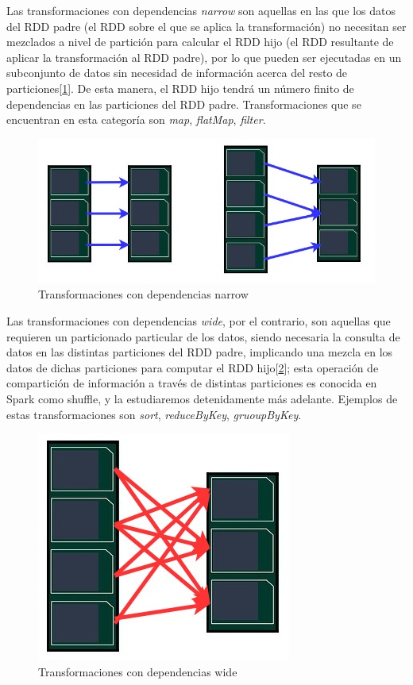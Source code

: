 Las transformaciones con dependencias \textit{narrow} son aquellas en las que los datos del RDD padre (el RDD sobre el que se aplica la transformación) no necesitan ser mezclados a nivel de partición para calcular el RDD hijo (el RDD resultante de aplicar la transformación al RDD padre), por lo que pueden ser ejecutadas en un subconjunto de datos sin necesidad de información acerca del resto de particiones[\ref{narrow}]. De esta manera, el RDD hijo tendrá un número finito de dependencias en las particiones del RDD padre. Transformaciones que se encuentran en esta categoría son \textit{map}, \textit{flatMap}, \textit{filter}.\\
\begin{figure}[H]
	\includegraphics[scale=0.6]{img/narrow}
	\caption{Transformaciones con dependencias narrow}
	\label{narrow}
\end{figure}
 
Las transformaciones con dependencias \textit{wide}, por el contrario, son aquellas que requieren un particionado particular de los datos, siendo necesaria la consulta de datos en las distintas particiones del RDD padre, implicando una mezcla en los datos de dichas particiones para computar el RDD hijo[\ref{wide}]; esta operación de compartición de información a través de distintas particiones es conocida en Spark como shuffle, y la estudiaremos detenidamente más adelante. Ejemplos de estas transformaciones son \textit{sort}, \textit{reduceByKey}, \textit{gruoupByKey}.\\
\begin{figure}[H]
	\includegraphics[scale=0.6]{img/wide}
	\centering
	\caption{Transformaciones con dependencias wide}
	\label{wide}
\end{figure}

